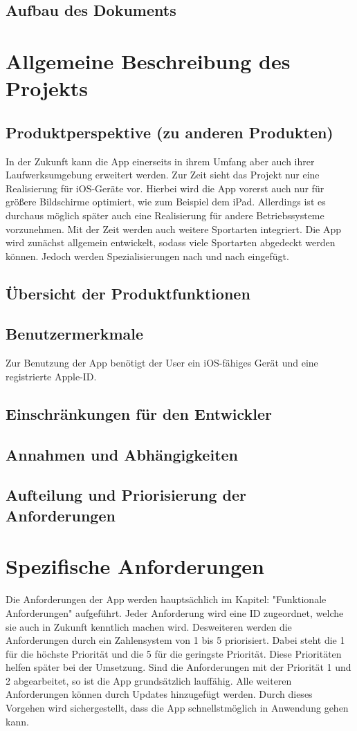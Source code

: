 \section{Aufbau des Dokuments}

\chapter{Allgemeine Beschreibung des Projekts}
\section{Produktperspektive (zu anderen Produkten)}
In der Zukunft kann die App einerseits in ihrem Umfang aber auch ihrer Laufwerksumgebung erweitert werden.
Zur Zeit sieht das Projekt nur eine Realisierung für iOS-Geräte vor. Hierbei wird die App vorerst auch nur für größere Bildschirme optimiert, wie zum Beispiel dem iPad. Allerdings ist es durchaus möglich später auch eine Realisierung für andere Betriebssysteme vorzunehmen.
Mit der Zeit werden auch weitere Sportarten integriert. Die App wird zunächst allgemein entwickelt, sodass viele Sportarten abgedeckt werden können. Jedoch werden Spezialisierungen nach und nach eingefügt.
 
\section{Übersicht der Produktfunktionen}
\section{Benutzermerkmale}
Zur Benutzung der App benötigt der User ein iOS-fähiges Gerät und eine registrierte Apple-ID.

\section{Einschränkungen für den Entwickler}
\section{Annahmen und Abhängigkeiten}
\section{Aufteilung und Priorisierung der Anforderungen}

\chapter{Spezifische Anforderungen}
Die Anforderungen der App werden hauptsächlich im Kapitel: "Funktionale Anforderungen" aufgeführt. Jeder Anforderung wird eine ID zugeordnet, welche sie auch in Zukunft kenntlich machen wird.
Desweiteren werden die Anforderungen durch ein Zahlensystem von 1 bis 5 priorisiert. Dabei steht die 1 für die höchste Priorität und die 5 für die geringste Priorität. Diese Prioritäten helfen später bei der Umsetzung. Sind die Anforderungen mit der Priorität 1 und 2 abgearbeitet, so ist die App grundsätzlich lauffähig. Alle weiteren Anforderungen können durch Updates hinzugefügt  werden. Durch dieses Vorgehen wird sichergestellt, dass die App schnellstmöglich in Anwendung gehen kann.

